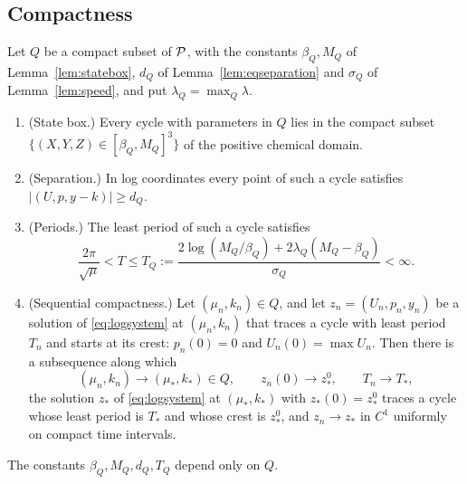 \subsection{Compactness}
\begin{theorem}\label{thm:compact}
Let $Q$ be a compact subset of $\mathcal P$, with the constants $\beta_Q,M_Q$ of Lemma~\ref{lem:statebox}, $d_Q$ of Lemma~\ref{lem:eqseparation} and $\sigma_Q$ of Lemma~\ref{lem:speed}, and put $\lambda_Q=\max_Q\lambda$.
\begin{enumerate}[label=\textup{(\alph*)}]
\item \textup{(State box.)} Every cycle with parameters in $Q$ lies in the compact subset $\{(X,Y,Z)\in[\beta_Q,M_Q]^3\}$ of the positive chemical domain.
\item \textup{(Separation.)} In log coordinates every point of such a cycle satisfies $|(U,p,y-k)|\ge d_Q$.
\item \textup{(Periods.)} The least period of such a cycle satisfies
\[
\frac{2\pi}{\sqrt\mu}<T\le T_Q:=\frac{2\log(M_Q/\beta_Q)+2\lambda_Q(M_Q-\beta_Q)}{\sigma_Q}<\infty .
\]
\item \textup{(Sequential compactness.)} Let $(\mu_n,k_n)\in Q$, and let $z_n=(U_n,p_n,y_n)$ be a solution of \eqref{eq:logsystem} at $(\mu_n,k_n)$ that traces a cycle with least period $T_n$ and starts at its crest: $p_n(0)=0$ and $U_n(0)=\max U_n$. Then there is a subsequence along which
\[
(\mu_n,k_n)\to(\mu_*,k_*)\in Q,\qquad z_n(0)\to z_*^0,\qquad T_n\to T_*,
\]
the solution $z_*$ of \eqref{eq:logsystem} at $(\mu_*,k_*)$ with $z_*(0)=z_*^0$ traces a cycle whose least period is $T_*$ and whose crest is $z_*^0$, and $z_n\to z_*$ in $C^1$ uniformly on compact time intervals.
\end{enumerate}
The constants $\beta_Q,M_Q,d_Q,T_Q$ depend only on $Q$.
\end{theorem}
